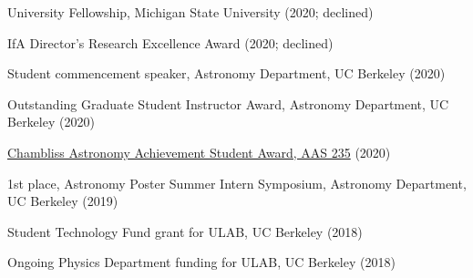 \item[{\color{numcolor}\scriptsize8}] University Fellowship, Michigan State University (2020; declined)

\item[{\color{numcolor}\scriptsize7}] IfA Director's Research Excellence Award (2020; declined)

\item[{\color{numcolor}\scriptsize6}] Student commencement speaker, Astronomy Department, UC Berkeley (2020)

\item[{\color{numcolor}\scriptsize5}] Outstanding Graduate Student Instructor Award, Astronomy Department, UC Berkeley (2020)

\item[{\color{numcolor}\scriptsize4}] \href{https://aas.org/grants-and-prizes/chambliss-astronomy-achievement-student-awards}{Chambliss Astronomy Achievement Student Award, AAS 235} (2020)

\item[{\color{numcolor}\scriptsize3}] 1st place, Astronomy Poster Summer Intern Symposium, Astronomy Department, UC Berkeley (2019)

\item[{\color{numcolor}\scriptsize2}] Student Technology Fund grant for ULAB, UC Berkeley (2018)

\item[{\color{numcolor}\scriptsize1}] Ongoing Physics Department funding for ULAB, UC Berkeley (2018)